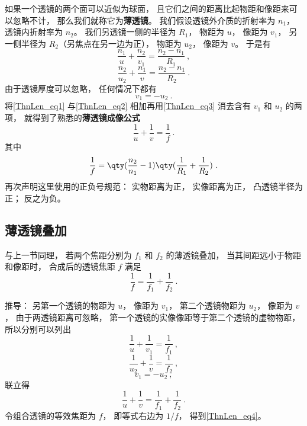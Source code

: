 如果一个透镜的两个面可以近似为球面， 且它们之间的距离比起物距和像距来可以忽略不计， 那么我们就称它为\textbf{薄透镜}。 我们假设透镜外介质的折射率为 $n_1$， 透镜内折射率为 $n_2$。 我们另透镜一侧的半径为 $R_1$， 物距为 $u$， 像距为 $v_1$， 另一侧半径为 $R_2$（另焦点在另一边为正）， 物距为 $u_2$， 像距为 $v$。 于是有
\begin{equation}\label{ThnLen_eq1}
\frac{n_1}{u} + \frac{n_2}{v_1} = \frac{n_2 - n_1}{R_1}~,
\end{equation}
\begin{equation}\label{ThnLen_eq2}
\frac{n_2}{u_2} + \frac{n_1}{v} = \frac{n_2 - n_1}{R_2}~.
\end{equation}
由于透镜厚度可以忽略， 任何情况下都有
\begin{equation}\label{ThnLen_eq3}
v_1 = -u_2~.
\end{equation}
将\autoref{ThnLen_eq1} 与\autoref{ThnLen_eq2} 相加再用\autoref{ThnLen_eq3} 消去含有 $v_1$ 和 $u_2$ 的两项， 就得到了熟悉的\textbf{薄透镜成像公式}
\begin{equation}
\frac{1}{u} + \frac{1}{v} = \frac{1}{f}~.
\end{equation}
其中
\begin{equation}
\frac{1}{f} = \qty(\frac{n_2}{n_1} - 1) \qty(\frac{1}{R_1} + \frac{1}{R_2})~.
\end{equation}
再次声明这里使用的正负号规范： 实物距离为正， 实像距离为正， 凸透镜半径为正； 反之为负。


\subsection{薄透镜叠加}
与上一节同理， 若两个焦距分别为 $f_1$ 和 $f_2$ 的薄透镜叠加， 当其间距远小于物距和像距时， 合成后的透镜焦距 $f$ 满足
\begin{equation}\label{ThnLen_eq4}
\frac{1}{f} = \frac{1}{f_1} + \frac{1}{f_2}~.
\end{equation}

推导： 另第一个透镜的物距为 $u$， 像距为 $v_1$， 第二个透镜物距为 $u_2$， 像距为 $v$， 由于两透镜距离可忽略， 第一个透镜的实像像距等于第二个透镜的虚物物距， 所以分别可以列出
\begin{equation}
\frac{1}{u} + \frac{1}{v_1} = \frac{1}{f_1}~,
\end{equation}
\begin{equation}
\frac{1}{u_2} + \frac{1}{v} = \frac{1}{f_2}~,
\end{equation}
\begin{equation}
v_1 = -u_2~,
\end{equation}
联立得
\begin{equation}
\frac{1}{u} + \frac{1}{v} = \frac{1}{f_1} + \frac{1}{f_2}~.
\end{equation}
令组合透镜的等效焦距为 $f$， 即等式右边为 $1/f$， 得到\autoref{ThnLen_eq4}。
